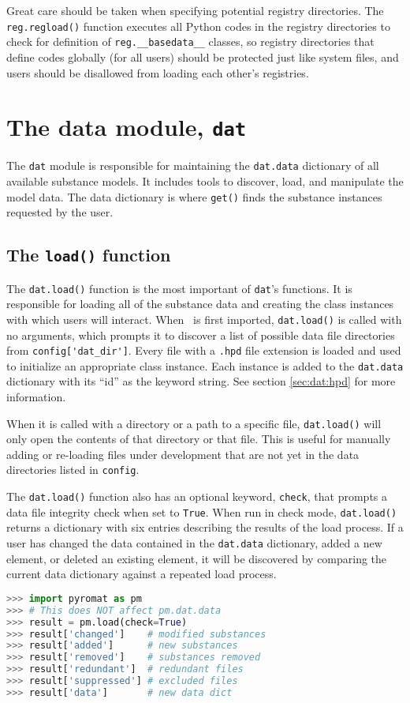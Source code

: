 Great care should be taken when specifying potential registry directories.  The \texttt{reg.regload()} function executes all Python codes in the registry directories to check for definition of \verb|reg.__basedata__| classes, so registry directories that define codes globally (for all users) should be protected just like system files, and users should be disallowed from loading each other's registries.

\section{The data module, \texttt{dat}}

The \texttt{dat} module is responsible for maintaining the \texttt{dat.data} dictionary of all available substance models.  It includes tools to discover, load, and manipulate the model data.  The data dictionary is where \texttt{get()} finds the substance instances requested by the user.

\subsection{The \texttt{load()} function}\label{sec:dat:load}

The \texttt{dat.load()} function is the most important of \texttt{dat}'s functions.  It is responsible for loading all of the substance data and creating the class instances with which users will interact.  When \PM\ is first imported, \texttt{dat.load()} is called with no arguments, which prompts it to discover a list of possible data file directories from \verb|config['dat_dir']|.  Every file with a \texttt{.hpd} file extension is loaded and used to initialize an appropriate class instance.  Each instance is added to the \texttt{dat.data} dictionary with its ``id'' as the keyword string.  See section \ref{sec:dat:hpd} for more information.

When it is called with a directory or a path to a specific file, \texttt{dat.load()} will only open the contents of that directory or that file.  This is useful for manually adding or re-loading files under development that are not yet in the data directories listed in \texttt{config}.

The \texttt{dat.load()} function also has an optional keyword, \texttt{check}, that prompts a data file integrity check when set to \texttt{True}.  When run in check mode, \texttt{dat.load()} returns a dictionary with six entries describing the results of the load process.  If a user has changed the data contained in the \texttt{dat.data} dictionary, added a new element, or deleted an existing element, it will be discovered by comparing the current data dictionary against a repeated load process.
\begin{lstlisting}[language=Python]
>>> import pyromat as pm
>>> # This does NOT affect pm.dat.data
>>> result = pm.load(check=True)
>>> result['changed']    # modified substances
>>> result['added']      # new substances
>>> result['removed']    # substances removed 
>>> result['redundant']  # redundant files
>>> result['suppressed'] # excluded files
>>> result['data']       # new data dict
\end{lstlisting}

